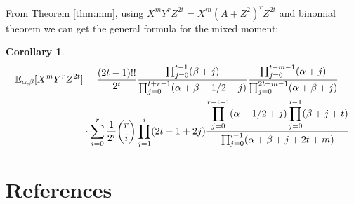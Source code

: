 \documentclass[review,authoryear]{elsarticle}
\def\E{\mathbb{E}}
\newtheorem{cor}{Corollary}
\begin{document}
From Theorem \ref{thm:mm},
using $X^m Y^r Z^{2t} = X^m(A+Z^2)^r Z^{2t} $ and
binomial theorem we can get
the general formula for the mixed moment:
\begin{cor}
\begin{align}
\E_{\alpha, \beta}[X^mY^rZ^{2t}] &= \frac{(2t-1)!!}{2^t}
\frac{\prod_{j=0}^{t-1} (\beta+j)}{\prod_{j=0}^{t+r-1} (\alpha+\beta-1/2+j)}
\frac{\prod_{j=0}^{t+m-1}(\alpha+j)}{\prod_{j=0}^{2t+m-1} (\alpha+\beta+j)}\notag\\
&\cdot\sum_{i=0}^r \frac{1}{2^i}\binom{r}{i}\prod_{j=1}^i (2t-1+2j)
\frac{\displaystyle\prod_{j=0}^{r-i-1}(\alpha-1/2+j)
\prod_{j=0}^{i-1}(\beta+j+t)}{\prod_{j=0}^{i-1}(\alpha+\beta+j+2t+m)}
\end{align}
\end{cor}
\section*{References}


\end{document}
